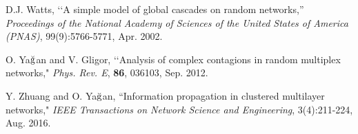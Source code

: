\documentclass[10pt, journal, compsoc]{IEEEtran}
\begin{document}
\begin{thebibliography}{1}
D.J. Watts, 
\lq \lq A simple model of global cascades on random networks,''
{\em Proceedings of the National Academy of Sciences of the United
States of America (PNAS)}, 99(9):5766-5771, Apr. 2002. 


O. Ya$\breve{\rm g}$an and V. Gligor, 
\lq \lq Analysis of complex contagions in random multiplex networks,"
{\em Phys. Rev. E}, {\bf 86}, 036103, Sep. 2012.

Y. Zhuang and O. Ya$\breve{\rm g}$an, 
``Information propagation in clustered multilayer networks,"
{\em IEEE Transactions on Network Science and Engineering}, 
3(4):211-224, Aug. 2016. 



\end{thebibliography}


\end{document}
